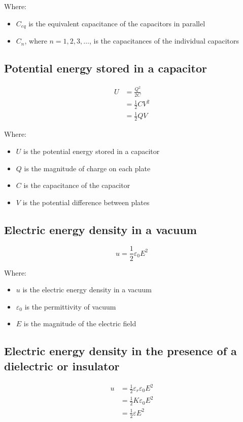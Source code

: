 \documentclass[11pt]{article}
\begin{document}
Where:
\begin{itemize}
\item \(C_{eq}\) is the equivalent capacitance of the capacitors in parallel
\item \(C_n\), where \(n = 1, 2, 3, \ldots\), is the capacitances of the individual capacitors
\end{itemize}
\subsection{Potential energy stored in a capacitor}
\label{sec:org08fbb1d}
\begin{align*}
U &= \frac{Q^2}{2C} \\
&= \frac{1}{2} CV^2 \\
&= \frac{1}{2} QV
\end{align*}

Where:
\begin{itemize}
\item \(U\) is the potential energy stored in a capacitor
\item \(Q\) is the magnitude of charge on each plate
\item \(C\) is the capacitance of the capacitor
\item \(V\) is the potential difference between plates
\end{itemize}
\subsection{Electric energy density in a vacuum}
\label{sec:orga9b18be}
\[u = \frac{1}{2} \varepsilon_0 E^2\]

Where:
\begin{itemize}
\item \(u\) is the electric energy density in a vacuum
\item \(\varepsilon_0\) is the permittivity of vacuum
\item \(E\) is the magnitude of the electric field
\end{itemize}
\subsection{Electric energy density in the presence of a dielectric or insulator}
\label{sec:org0057a28}
\begin{align*}
u &= \frac{1}{2} \varepsilon_r \varepsilon_0 E^2 \\
&= \frac{1}{2} K \varepsilon_0 E^2 \\
&= \frac{1}{2} \varepsilon E^2
\end{align*}
\end{document}

